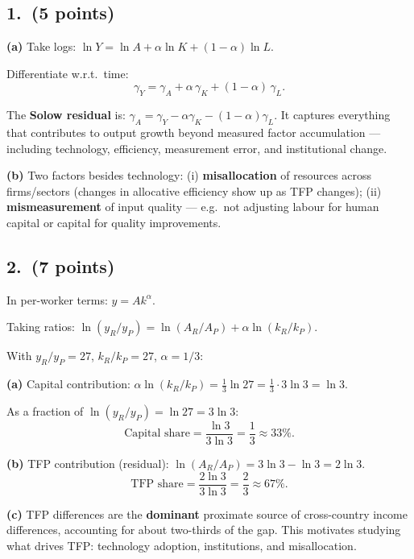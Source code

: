 \documentclass[a4paper,11pt]{article}
\begin{document}
\subsection*{1.\ (5 points)}

\begin{answerbox}
\textbf{(a)} Take logs: $\ln Y = \ln A + \alpha\ln K + (1-\alpha)\ln L$.

Differentiate w.r.t.\ time:
\[
    \boxed{\gamma_Y = \gamma_A + \alpha\,\gamma_K + (1-\alpha)\,\gamma_L.}
\]

The \textbf{Solow residual} is:
$\gamma_A = \gamma_Y - \alpha\gamma_K - (1-\alpha)\gamma_L$.
It captures everything that contributes to output growth beyond measured factor
accumulation --- including technology, efficiency, measurement error, and institutional
change.

\textbf{(b)} Two factors besides technology: (i) \textbf{misallocation} of resources
across firms/sectors (changes in allocative efficiency show up as TFP changes);
(ii) \textbf{mismeasurement} of input quality --- e.g.\ not adjusting labour for
human capital or capital for quality improvements.
\end{answerbox}

\subsection*{2.\ (7 points)}

\begin{answerbox}
In per-worker terms: $y = A k^{\alpha}$.

Taking ratios:
$\ln(y_R/y_P) = \ln(A_R/A_P) + \alpha\ln(k_R/k_P)$.

With $y_R/y_P = 27$, $k_R/k_P = 27$, $\alpha = 1/3$:

\textbf{(a)} Capital contribution:
$\alpha\ln(k_R/k_P) = \tfrac{1}{3}\ln 27 = \tfrac{1}{3}\cdot 3\ln 3 = \ln 3$.

As a fraction of $\ln(y_R/y_P) = \ln 27 = 3\ln 3$:
\[
    \text{Capital share} = \frac{\ln 3}{3\ln 3} = \boxed{\frac{1}{3} \approx 33\%.}
\]

\textbf{(b)} TFP contribution (residual):
$\ln(A_R/A_P) = 3\ln 3 - \ln 3 = 2\ln 3$.
\[
    \text{TFP share} = \frac{2\ln 3}{3\ln 3} = \boxed{\frac{2}{3} \approx 67\%.}
\]

\textbf{(c)} TFP differences are the \textbf{dominant} proximate source of cross-country
income differences, accounting for about two-thirds of the gap.  This motivates studying
what drives TFP: technology adoption, institutions, and misallocation.
\end{answerbox}
\end{document}
